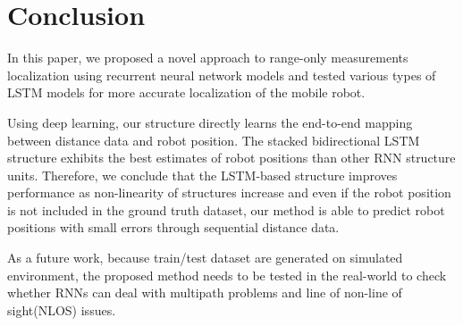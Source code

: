 \documentclass[letterpaper, 10 pt, conference]{ieeeconf}  %
\begin{document}
\section{Conclusion}

In this paper, we proposed a novel approach to range-only measurements localization using recurrent neural network models and tested various types of LSTM models for more accurate localization of the mobile robot. 

Using deep learning, our structure directly learns the end-to-end mapping between distance data and robot position. The stacked bidirectional LSTM structure exhibits the best estimates of robot positions than other RNN structure units. Therefore, we conclude that  the LSTM-based structure improves performance as non-linearity of structures increase and even if the robot position is not included in the ground truth dataset, our method is able to predict robot positions with small errors through sequential distance data. 

As a future work, because train/test dataset are generated on simulated environment, the proposed method needs to be tested in the real-world to check whether RNNs can deal with multipath problems and line of non-line of sight(NLOS) issues.


\end{document}
